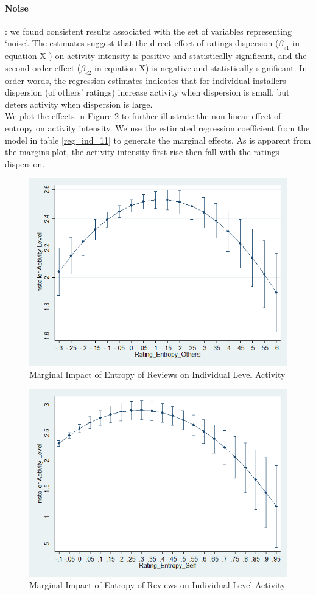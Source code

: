 \documentclass[msom,blindrev]{informs3}
\begin{document}
\paragraph{Noise}: we found consistent results associated with the set of variables representing `noise'. The estimates suggest that the direct effect of ratings dispersion ($\beta_{e1}$ in equation X  ) on activity intensity is positive and statistically significant, and the second order effect ($\beta_{e2}$ in equation X) is negative and statistically significant. In order words, the regression estimates indicates that for individual installers dispersion (of others' ratings) increase activity when dispersion is small, but deters activity when dispersion is large.\\
We plot the effects in Figure \ref{marginsplot_ind_ent_self} to further illustrate the non-linear effect of entropy on activity intensity. We use the estimated regression coefficient from the model in table \ref{reg_ind_11}  to generate the marginal effects. As is apparent from the margins plot, the activity intensity first rise then fall with the ratings dispersion.

\begin{figure}
	\centering
	\includegraphics[width=0.7\linewidth]{marginsplot_entothers.png}
	\caption{Marginal Impact of Entropy of Reviews on Individual Level Activity}
	\label{marginsplot_ind_ent_others}
\end{figure}



\begin{figure}
	\centering
	\includegraphics[width=0.7\linewidth]{marginsplot_entself.png}
	\caption{Marginal Impact of Entropy of Reviews on Individual Level Activity}
	\label{marginsplot_ind_ent_self}
\end{figure}
\end{document}
